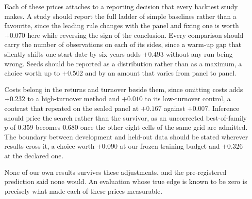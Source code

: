 \documentclass[sigconf,nonacm]{acmart}
\begin{document}
Each of these prices attaches to a reporting decision that every backtest
study makes. A study should report the full ladder of simple baselines rather
than a favourite, since the leading rule changes with the panel and fixing one
is worth $+0.070$ here while reversing the sign of the conclusion. Every
comparison should carry the number of observations on each of its sides, since
a warm-up gap that silently shifts one start date by six years adds $+0.493$
without any run being wrong. Seeds should be reported as a distribution rather
than as a maximum, a choice worth up to $+0.502$ and by an amount that varies
from panel to panel.

Costs belong in the returns and turnover beside them, since omitting costs
adds $+0.232$ to a high-turnover method and $+0.010$ to its low-turnover
control, a contrast that repeated on the sealed panel at $+0.167$ against
$+0.007$. Inference should price the search rather than the survivor, as an
uncorrected best-of-family $p$ of $0.359$ becomes $0.680$ once the other eight
cells of the same grid are admitted. The boundary between development and
held-out data should be stated wherever results cross it, a choice worth
$+0.090$ at our frozen training budget and $+0.326$ at the declared one.

None of our own results survives these adjustments, and the pre-registered
prediction said none would. An evaluation whose true edge is known to be zero
is precisely what made each of these prices measurable.



\end{document}

